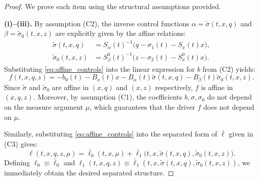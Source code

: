 \documentclass[11pt,a4paper]{article}
\begin{document}
\begin{proof}
We prove each item using the structural assumptions provided.

\smallskip
\noindent
\textbf{(i)--(iii).} By assumption \textnormal{(C2)}, the inverse control functions $\alpha = \tilde{\sigma}(t,x,q)$ and $\beta = \tilde{\sigma}_0(t,x,z)$ are explicitly given by the affine relations:
\begin{equation}\label{eq:affine_controls}
\begin{aligned}
\tilde{\sigma}(t, x, q) &= S_\alpha(t)^{-1} \big( q - \sigma_1(t) - S_x(t)x \big), \\
\tilde{\sigma}_0(t, x, z) &= S_\beta^0(t)^{-1} \big( z - \sigma_2(t) - S_x^0(t)x \big).
\end{aligned}
\end{equation}
Substituting \eqref{eq:affine_controls} into the linear expression for $b$ from \textnormal{(C2)} yields:
\[
f(t,x,q,z) = -b_0(t) - B_x(t)x - B_\alpha(t)\tilde{\sigma}(t, x, q) - B_\beta(t)\tilde{\sigma}_0(t, x, z).
\]
Since $\tilde{\sigma}$ and $\tilde{\sigma}_0$ are affine in $(x,q)$ and $(x,z)$ respectively, $f$ is affine in $(x,q,z)$. Moreover, by assumption \textnormal{(C1)}, the coefficients $b, \sigma, \sigma_0$ do not depend on the measure argument $\mu$, which guarantees that the driver $f$ does not depend on $\mu$.

Similarly, substituting \eqref{eq:affine_controls} into the separated form of $\bar{\ell}$ given in \textnormal{(C3)} gives:
\[
\ell(t, x, q, z, \mu) = \bar{\ell}_0(t,x,\mu) + \bar{\ell}_1\big(t, x, \tilde{\sigma}(t, x, q), \tilde{\sigma}_0(t, x, z)\big).
\]
Defining $\ell_0 \equiv \bar{\ell}_0$ and $\ell_1(t, x, q, z) \equiv \bar{\ell}_1(t,x,\tilde{\sigma}(t,x,q),\tilde{\sigma}_0(t,x,z))$, we immediately obtain the desired separated structure.


\end{proof}
\end{document}
